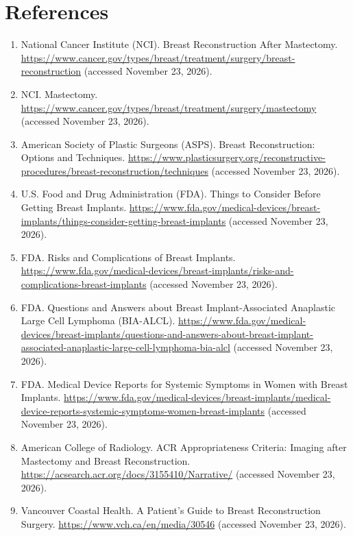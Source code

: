 \section*{References}
\begin{enumerate}
  \item National Cancer Institute (NCI). Breast Reconstruction After Mastectomy. \url{https://www.cancer.gov/types/breast/treatment/surgery/breast-reconstruction} (accessed November 23, 2026).
  \item NCI. Mastectomy. \url{https://www.cancer.gov/types/breast/treatment/surgery/mastectomy} (accessed November 23, 2026).
  \item American Society of Plastic Surgeons (ASPS). Breast Reconstruction: Options and Techniques. \url{https://www.plasticsurgery.org/reconstructive-procedures/breast-reconstruction/techniques} (accessed November 23, 2026).
  \item U.S. Food and Drug Administration (FDA). Things to Consider Before Getting Breast Implants. \url{https://www.fda.gov/medical-devices/breast-implants/things-consider-getting-breast-implants} (accessed November 23, 2026).
  \item FDA. Risks and Complications of Breast Implants. \url{https://www.fda.gov/medical-devices/breast-implants/risks-and-complications-breast-implants} (accessed November 23, 2026).
  \item FDA. Questions and Answers about Breast Implant-Associated Anaplastic Large Cell Lymphoma (BIA-ALCL). \url{https://www.fda.gov/medical-devices/breast-implants/questions-and-answers-about-breast-implant-associated-anaplastic-large-cell-lymphoma-bia-alcl} (accessed November 23, 2026).
  \item FDA. Medical Device Reports for Systemic Symptoms in Women with Breast Implants. \url{https://www.fda.gov/medical-devices/breast-implants/medical-device-reports-systemic-symptoms-women-breast-implants} (accessed November 23, 2026).
  \item American College of Radiology. ACR Appropriateness Criteria: Imaging after Mastectomy and Breast Reconstruction. \url{https://acsearch.acr.org/docs/3155410/Narrative/} (accessed November 23, 2026).
  \item Vancouver Coastal Health. A Patient's Guide to Breast Reconstruction Surgery. \url{https://www.vch.ca/en/media/30546} (accessed November 23, 2026).
\end{enumerate}

\clearpage

